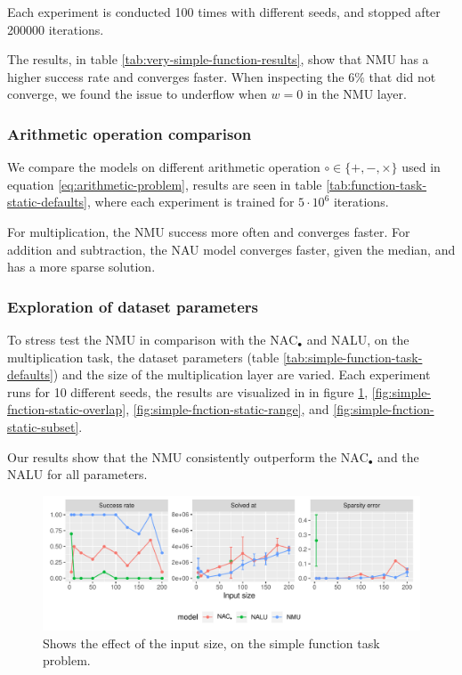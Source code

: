 Each experiment is conducted 100 times with different seeds, and stopped after 200000 iterations.

The results, in table \ref{tab:very-simple-function-results}, show that NMU has a higher success rate and converges faster. When inspecting the $6\%$ that did not converge, we found the issue to underflow when $w = 0$ in the NMU layer.


\subsubsection{Arithmetic operation comparison}
We compare the models on different arithmetic operation $\circ \in \{+, -, \times\}$ used in equation \ref{eq:arithmetic-problem}, results are seen in table \ref{tab:function-task-static-defaults}, where each experiment is trained for $5 \cdot 10^6$ iterations.

For multiplication, the NMU success more often and converges faster. For addition and subtraction, the NAU model converges faster, given the median, and has a more sparse solution.



\subsubsection{Exploration of dataset parameters}
To stress test the NMU in comparison with the  $\mathrm{NAC}_{\bullet}$ and NALU, on the multiplication task, the dataset parameters (table \ref{tab:simple-function-task-defaults}) and the size of the multiplication layer are varied. Each experiment runs for 10 different seeds, the results are visualized in in figure \ref{fig:simple-fnction-static-input-size}, \ref{fig:simple-fnction-static-overlap}, \ref{fig:simple-fnction-static-range}, and \ref{fig:simple-fnction-static-subset}. 

Our results show that the NMU consistently outperform the $\mathrm{NAC}_{\bullet}$ and the NALU for all parameters.

\begin{figure}[H]
\centering
\includegraphics[width=\linewidth]{results/simple_function_static_input_size.pdf}
\caption{Shows the effect of the input size, on the simple function task problem.}
\label{fig:simple-fnction-static-input-size}
\end{figure}

